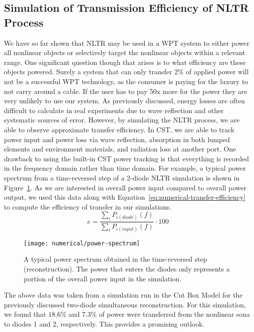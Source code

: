 \subsection{Simulation of Transmission Efficiency of NLTR Process}

We have so far shown that NLTR may be used in a WPT system to either power all nonlinear objects or selectively target the nonlinear objects within a relevant range. One significant question though that arises is to what efficiency are these objects powered. Surely a system that can only transfer 2\% of applied power will not be a successful WPT technology, as the consumer is paying for the luxury to not carry around a cable. If the user has to pay 50x more for the power they are very unlikely to use our system.
As previously discussed, energy losses are often difficult to calculate in real experiments due to wave reflection and other systematic sources of error. However, by simulating the NLTR process, we are able to observe approximate transfer efficiency. In CST, we are able to track power input and power loss via wave reflection, absorption in both lumped elements and environment materials, and radiation loss at another port. One drawback to using the built-in CST power tracking is that everything is recorded in the frequency domain rather than time domain. For example, a typical power spectrum from a time-reversed step of a 2-diode NLTR simulation is shown in Figure~\ref{fig:numerical-power-spectrum}. As we are interested in overall power input compared to overall power output, we used this data along with Equation~\ref{eq:numerical-transfer-efficiency} to compute the efficiency of transfer in our simulations.
\begin{equation}
e = \frac{\sum_{i}P_{i(diode)}(f)}{\sum_{i}P_{i(input)}(f)} \cdot 100
\label{eq:numerical-transfer-efficiency}
\end{equation}

\begin{figure}[t]
\centering
\texttt{[image: numerical/power-spectrum]}
\caption[Example transfer efficiency for a two-diode simultaneous reconstruction]{A typical power spectrum obtained in the time-reversed step (reconstruction). The power that enters the diodes only represents a portion of the overall power input in the simulation.}
\label{fig:numerical-power-spectrum}
\end{figure}

 The above data was taken from a simulation run in the Cut Box Model for the previously discussed two-diode simultaneous reconstruction. For this simulation, we found that $18.6$\% and $7.3$\% of power were transferred from the nonlinear sona to diodes 1 and 2, respectively.  This provides a promising outlook.

